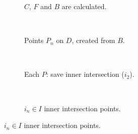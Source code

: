             \begin{figure}[H]
                \centering
                \begin{subfigure}[b]{.5\columnwidth}
                    \centering
                    \begin{tikzpicture}[x=2.5pt,y=2.5pt,scale=0.1
                            ]
                         
                    \end{tikzpicture}
                    \caption{$C$, $F$ and $B$ are calculated.}
                    \label{fig:comp-iter-1}
                \end{subfigure}\\
                \vspace{0.03\textheight}
                \begin{subfigure}[b]{.5\columnwidth}
                    \centering
                    \begin{tikzpicture}[x=2.5pt,y=2.5pt,scale=0.1]
                         
                    \end{tikzpicture}
                    \caption{Points $P_n$ on $D$, created from $B$.}
                    \label{fig:comp-iter-2}
                \end{subfigure}\\
                \vspace{0.03\textheight}
                \begin{subfigure}[b]{.5\columnwidth}
                    \centering
                    \begin{tikzpicture}[x=2.5pt,y=2.5pt,scale=0.1]
                         
                    \end{tikzpicture}
                    \caption{Each $P$: save inner intersection ($i_2$).}
                    \label{fig:comp-iter-3}
                \end{subfigure}\\
                \vspace{0.03\textheight}
                \begin{subfigure}[b]{.5\columnwidth}
                    \centering
                    \begin{tikzpicture}[x=2.5pt,y=2.5pt,scale=0.1
                            ]
                         
                    \end{tikzpicture}
                    \caption{$i_n\in I$ inner intersection points.}
                    \label{fig:comp-iter-4}
                \end{subfigure}


\end{figure}
